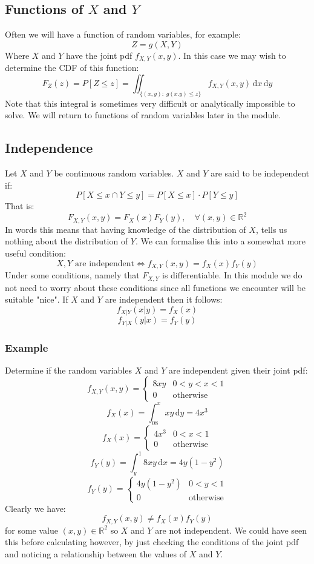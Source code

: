 \documentclass[12pt]{article}
\begin{document}
\subsection{Functions of \(X\) and \(Y\)}
Often we will have a function of random variables, for example:
\[Z=g(X,Y)\]
Where \(X\) and \(Y\) have the joint pdf \(f_{X,Y}(x,y)\). In this case we may wish to determine the CDF of this function:
\[F_{Z}(z)=P[Z\leq z]=\iint_{\{(x,y):\; g(x.y)\leq z\}}f_{X,Y}(x,y)\,\text{d}x\,\text{d}y\]
Note that this integral is sometimes very difficult or analytically impossible to solve. We will return to functions of random variables later in the module.
\subsection{Independence}
Let \(X\) and \(Y\) be continuous random variables. \(X\) and \(Y\) are said to be independent if:
\[P[X\leq x\cap Y\leq y]=P[X\leq x]\cdot P[Y\leq y]\]
That is:
\[F_{X,Y}(x,y)=F_{X}(x)F_{Y}(y),\quad \forall (x,y)\in\mathbb{R}^2\]
In words this means that having knowledge of the distribution of \(X\), tells us nothing about the distribution of \(Y\). We can formalise this into a somewhat more useful condition:
\[X,Y\text{ are independent}\iff f_{X,Y}(x,y)=f_{X}(x)f_{Y}(y)\]
Under some conditions, namely that \(F_{X,Y}\) is differentiable. In this module we do not need to worry about these conditions since all functions we encounter will be suitable "nice". If \(X\) and \(Y\) are independent then it follows:
\[f_{X|Y}(x|y)=f_X(x)\]
\[f_{Y|X}(y|x)=f_Y(y)\]
\subsubsection*{Example}
Determine if the random variables \(X\) and \(Y\) are independent given their joint pdf:
\[f_{X,Y}(x,y)=\begin{cases}
    8xy & 0<y<x<1 \\
    0 & \text{otherwise}
\end{cases}\]
\[f_{X}(x)=\int^x_08xy\,\text{d}y=4x^3\]
\[f_{X}(x)=\begin{cases}
    4x^3 & 0<x<1 \\
    0 & \text{otherwise}
\end{cases}\]
\[f_{Y}(y)=\int^1_y8xy\,\text{d}x=4y(1-y^2)\]
\[f_{Y}(y)=\begin{cases}
    4y(1-y^2) & 0<y<1 \\
    0 & \text{otherwise}
\end{cases}\]
Clearly we have:
\[f_{X,Y}(x,y)\ne f_{X}(x)f_{Y}(y)\]
for some value \((x,y)\in\mathbb{R}^2\) so \(X\) and \(Y\) are not independent. We could have seen this before calculating however, by just checking the conditions of the joint pdf and noticing a relationship between the values of \(X\) and \(Y\).
\clearpage
\end{document}
